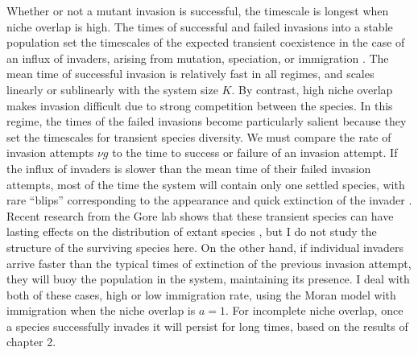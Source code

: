Whether or not a mutant invasion is successful, the timescale is longest when niche overlap is high. %
The times of successful and failed invasions into a stable population set the timescales of the expected transient coexistence in the case of an influx of invaders, arising from mutation, speciation, or immigration \cite{Hubbell2001,Desai2007,Carroll2015}. 
The mean time of successful invasion is relatively fast in all regimes, and scales linearly or sublinearly with the system size $K$. 
By contrast, high niche overlap makes invasion difficult due to strong competition between the species. 
In this regime, the times of the failed invasions become particularly salient because they set the timescales for transient species diversity. %
We must compare the rate of invasion attempts $\nu g$ to the time to success or failure of an invasion attempt. 
If the influx of invaders is slower than the mean time of their failed invasion attempts, most of the time the system will contain only one settled species, with rare ``blips'' corresponding to the appearance and quick extinction of the invader \cite{Dias1996,Hubbell2001,Chesson2000}. 
Recent research from the Gore lab shows that these transient species can have lasting effects on the distribution of extant species \cite{Amor2019}, but I do not study the structure of the surviving species here. 
On the other hand, if individual invaders arrive faster than the typical times of extinction of the previous invasion attempt, they will buoy the population in the system, maintaining its presence. %
I deal with both of these cases, high or low immigration rate, using the Moran model with immigration when the niche overlap is $a=1$. 
For incomplete niche overlap, once a species successfully invades it will persist for long times, based on the results of chapter 2. 
\fi

